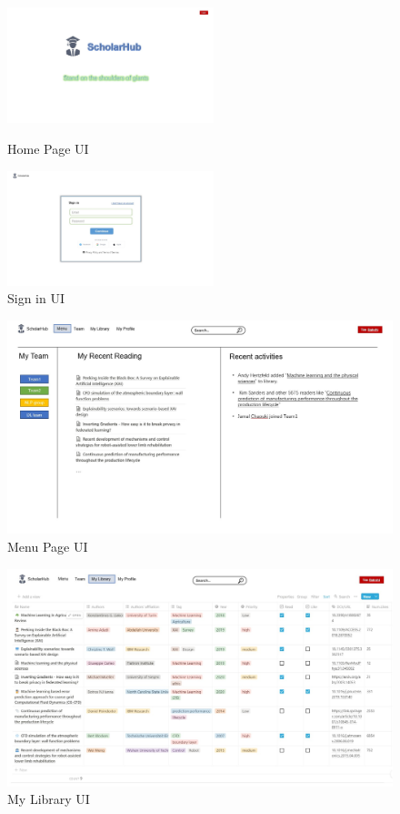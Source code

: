 \documentclass[]{scrreprt}
\begin{document}
\begin{figure}[htbp]
	\centering
	\begin{minipage}[t]{0.48\textwidth}
		\centering
		\includegraphics[width=6cm]{./section/appendix/img/UI Home page.jpg}
		\caption{Home Page UI}
	\end{minipage}
	\begin{minipage}[t]{0.48\textwidth}
		\centering
		\includegraphics[width=6cm]{./section/appendix/img/UI sign in.jpg}
		\caption{Sign in UI}
	\end{minipage}
\end{figure}

\begin{figure}[htp]
	\centering
	\includegraphics[width=\textwidth]{./section/appendix/img/UI MainPage.jpg}
	\caption{Menu Page UI}
	\label{fig:Memu Page}
\end{figure}

\begin{figure}[htp]
	\centering
	\includegraphics[width=\textwidth]{./section/appendix/img/UI My Library.jpg}
	\caption{My Library UI}
	\label{My Library UI}
\end{figure}
\end{document}

